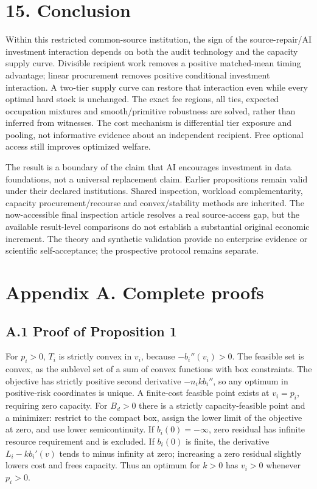 \documentclass[
  11pt,
  a4paper,
]{article}
\begin{document}
\hypertarget{conclusion}{%
\section{15. Conclusion}\label{conclusion}}

Within this restricted common-source institution, the sign of the
source-repair/AI investment interaction depends on both the audit
technology and the capacity supply curve. Divisible recipient work
removes a positive matched-mean timing advantage; linear procurement
removes positive conditional investment interaction. A two-tier supply
curve can restore that interaction even while every optimal hard stock
is unchanged. The exact fee regions, all ties, expected occupation
mixtures and smooth/primitive robustness are solved, rather than
inferred from witnesses. The cost mechanism is differential tier
exposure and pooling, not informative evidence about an independent
recipient. Free optional access still improves optimized welfare.

The result is a boundary of the claim that AI encourages investment in
data foundations, not a universal replacement claim. Earlier
propositions remain valid under their declared institutions. Shared
inspection, workload complementarity, capacity procurement/recourse and
convex/stability methods are inherited. The now-accessible final
inspection article resolves a real source-access gap, but the available
result-level comparisons do not establish a substantial original
economic increment. The theory and synthetic validation provide no
enterprise evidence or scientific self-acceptance; the prospective
protocol remains separate.

\hypertarget{appendix-a.-complete-proofs}{%
\section{Appendix A. Complete
proofs}\label{appendix-a.-complete-proofs}}

\hypertarget{a.1-proof-of-proposition-1}{%
\subsection{A.1 Proof of Proposition
1}\label{a.1-proof-of-proposition-1}}

For \(p_i>0\), \(T_i\) is strictly convex in \(v_i\), because
\(-b_i''(v_i)>0\). The feasible set is convex, as the sublevel set of a
sum of convex functions with box constraints. The objective has strictly
positive second derivative \(-n_i k b_i''\), so any optimum in
positive-risk coordinates is unique. A finite-cost feasible point exists
at \(v_i=p_i\), requiring zero capacity. For \(B_d>0\) there is a
strictly capacity-feasible point and a minimizer: restrict to the
compact box, assign the lower limit of the objective at zero, and use
lower semicontinuity. If \(b_i(0)=-\infty\), zero residual has infinite
resource requirement and is excluded. If \(b_i(0)\) is finite, the
derivative \(L_i-kb_i'(v)\) tends to minus infinity at zero; increasing
a zero residual slightly lowers cost and frees capacity. Thus an optimum
for \(k>0\) has \(v_i>0\) whenever \(p_i>0\).
\end{document}
